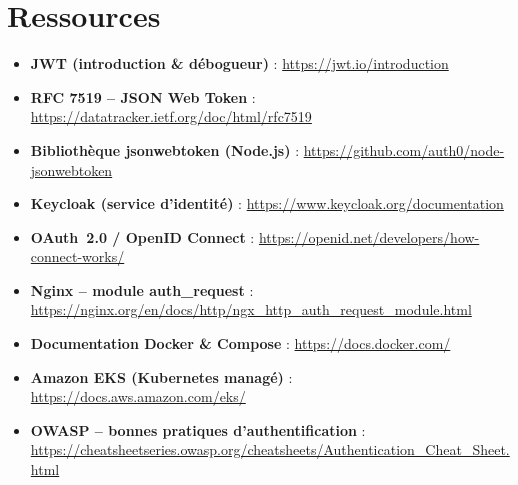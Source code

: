 \newpage

\section*{Ressources}

\begin{itemize}
	\item \textbf{JWT (introduction \& débogueur)} : \url{https://jwt.io/introduction}
	\item \textbf{RFC 7519 -- JSON Web Token} : \url{https://datatracker.ietf.org/doc/html/rfc7519}
	\item \textbf{Bibliothèque jsonwebtoken (Node.js)} : \url{https://github.com/auth0/node-jsonwebtoken}
	\item \textbf{Keycloak (service d'identité)} : \url{https://www.keycloak.org/documentation}
	\item \textbf{OAuth~2.0 / OpenID Connect} : \url{https://openid.net/developers/how-connect-works/}
	\item \textbf{Nginx -- module auth\_request} : \url{https://nginx.org/en/docs/http/ngx_http_auth_request_module.html}
	\item \textbf{Documentation Docker \& Compose} : \url{https://docs.docker.com/}
	\item \textbf{Amazon EKS (Kubernetes managé)} : \url{https://docs.aws.amazon.com/eks/}
	\item \textbf{OWASP -- bonnes pratiques d'authentification} : \url{https://cheatsheetseries.owasp.org/cheatsheets/Authentication_Cheat_Sheet.html}
\end{itemize}
